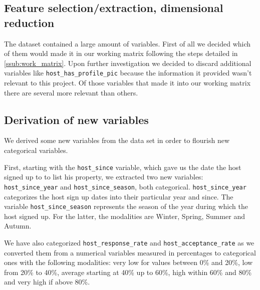 \subsection{Feature selection/extraction, dimensional reduction}

The \airbnb dataset contained a large amount of variables. First of all we
decided which of them would made it in our working matrix following the steps
detailed in \ref{ssub:work_matrix}. Upon further investigation we decided to
discard additional variables like \texttt{host\_has\_profile\_pic} because the
information it provided wasn't relevant to this project. Of those variables that
made it into our working matrix there are several more relevant than others.

\begin{comment} %

\subsubsection{Instance selection}

\subsubsection{Data transformation}

\end{comment}

\subsection{Derivation of new variables}

We derived some new variables from the data set in order to flourish new
categorical variables.

First, starting with the \texttt{host\_since} variable, which gave us the date
the host signed up to \airbnb to list his property, we extracted two new
variables: \texttt{host\_since\_year} and \texttt{host\_since\_season}, both
categorical. \texttt{host\_since\_year} categorizes the host sign up dates into
their particular year and since. The variable \texttt{host\_since\_season}
represents the season of the year during which the host signed up. For the
latter, the modalities are Winter, Spring, Summer and Autumn.

We have also categorized \texttt{host\_response\_rate} and
\texttt{host\_acceptance\_rate} as we converted them from a numerical 
variables
measured in percentages to categorical ones with the following 
modalities: very
low for values between 0\% and 20\%, low from 20\% to 40\%, average 
starting at 40\% up to 60\%, high within 60\% and 80\% and very high if
above 80\%.

